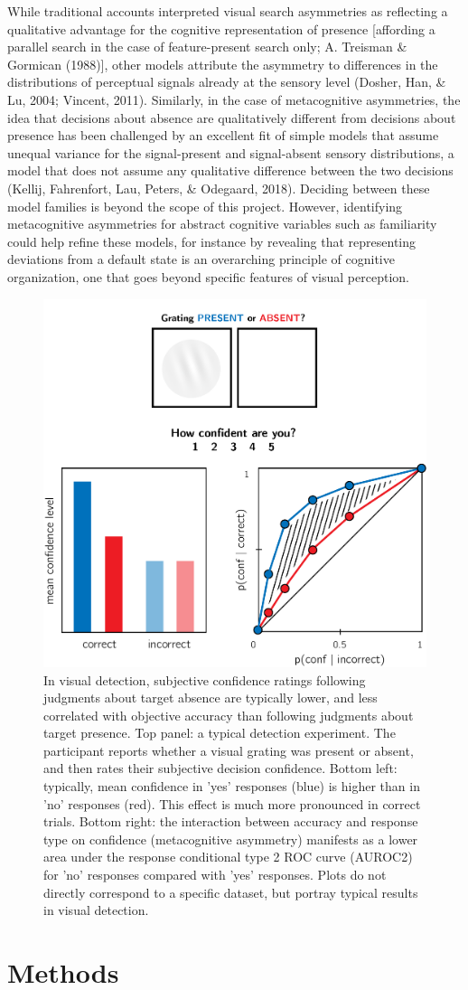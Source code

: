 \documentclass[12pt,twoside]{reedthesis}
\begin{document}
While traditional accounts interpreted visual search asymmetries as reflecting a qualitative advantage for the cognitive representation of presence {[}affording a parallel search in the case of feature-present search only; A. Treisman \& Gormican (1988){]}, other models attribute the asymmetry to differences in the distributions of perceptual signals already at the sensory level (Dosher, Han, \& Lu, 2004; Vincent, 2011). Similarly, in the case of metacognitive asymmetries, the idea that decisions about absence are qualitatively different from decisions about presence has been challenged by an excellent fit of simple models that assume unequal variance for the signal-present and signal-absent sensory distributions, a model that does not assume any qualitative difference between the two decisions (Kellij, Fahrenfort, Lau, Peters, \& Odegaard, 2018). Deciding between these model families is beyond the scope of this project. However, identifying metacognitive asymmetries for abstract cognitive variables such as familiarity could help refine these models, for instance by revealing that representing deviations from a default state is an overarching principle of cognitive organization, one that goes beyond specific features of visual perception.
\begin{figure}
\includegraphics[width=0.6\linewidth]{figure/asymmetry/asymmetry} \caption[Behavioural asymmetries in perceptual detection]{In visual detection, subjective confidence ratings following judgments about target absence are typically lower, and less correlated with objective accuracy than following judgments about target presence. Top panel: a typical detection experiment. The participant reports whether a visual grating was present or absent, and then rates their subjective decision confidence. Bottom left: typically, mean confidence in 'yes' responses (blue) is higher than in 'no' responses (red). This effect is much more pronounced in correct trials. Bottom right: the interaction between accuracy and response type on confidence (metacognitive asymmetry) manifests as a lower area under the response conditional type 2 ROC curve (AUROC2) for 'no' responses compared with 'yes' responses. Plots do not directly correspond to a specific dataset, but portray typical results in visual detection.}\label{fig:asymmetry-asymmetry}
\end{figure}
\hypertarget{methods-3}{%
\section{Methods}\label{methods-3}}
\end{document}
